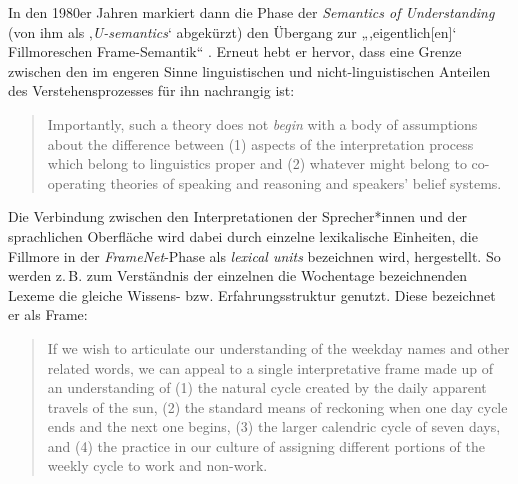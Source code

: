 In den 1980er Jahren markiert dann die Phase der \emph{Semantics of Understanding} (von ihm als ‚\emph{U-semantics}` abgekürzt) den Übergang zur „‚eigentlich{[}en{]}` Fillmoreschen Frame-Semantik`` \autocite[92]{busseFrameSemantikKompendium2012}. Erneut hebt er hervor, dass eine Grenze zwischen den im engeren Sinne linguistischen und nicht-linguistischen Anteilen des Verstehensprozesses für ihn nachrangig ist:

\begin{quote}
Importantly, such a theory does not \emph{begin} with a body of assumptions about the difference between (1) aspects of the interpretation process which belong to linguistics proper and (2) whatever might belong to co-operating theories of speaking and reasoning and speakers' belief systems. \autocite[222]{fillmoreFramesSemanticsUnderstanding1985}
\end{quote}

Die Verbindung zwischen den Interpretationen der Sprecher*innen und der sprachlichen Oberfläche wird dabei durch einzelne lexikalische Einheiten, die Fillmore in der \emph{FrameNet}-Phase als \emph{lexical units} bezeichnen wird, hergestellt. So werden z.\,B. zum Verständnis der einzelnen die Wochentage bezeichnenden Lexeme die gleiche Wissens- bzw. Erfahrungsstruktur genutzt. Diese bezeichnet er als Frame:

\begin{quote}
If we wish to articulate our understanding of the weekday names and other related words, we can appeal to a single interpretative frame made up of an understanding of (1) the natural cycle created by the daily apparent travels of the sun, (2) the standard means of reckoning when one day cycle ends and the next one begins, (3) the larger calendric cycle of seven days, and (4) the practice in our culture of assigning different portions of the weekly cycle to work and non-work. \autocite[223-224]{fillmoreFramesSemanticsUnderstanding1985}
\end{quote}

